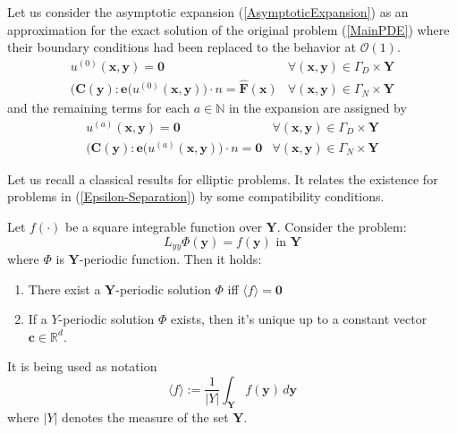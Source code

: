 Let us consider the asymptotic expansion (\ref{AsymptoticExpansion}) as an approximation for the exact solution of the original problem (\ref{MainPDE}) where their boundary conditions had been replaced to the behavior at $\mathcal{O}(1)$.
\begin{equation*}
    \begin{array}{cc}   
        u^{(0)}(\mathbf{x},\mathbf{y}) = \mathbf{0} & \forall (\mathbf{x}, \mathbf{y}) \in \Gamma_D\times \mathbf{Y}\\
        \big(\mathbf{C}(\mathbf{y}): \mathbf{e} (u^{(0)}(\mathbf{x}, \mathbf{y}) \big) \cdot n = \hat{\mathbf{F}}(\mathbf{x}) & \forall (\mathbf{x},\mathbf{y}) \in \Gamma_N \times \mathbf{Y}
    \end{array}
\end{equation*}
and the remaining terms for each $a \in \mathbb{N}$ in the expansion are assigned by
\begin{equation*}
    \begin{array}{cc}
        u^{(a)}(\mathbf{x},\mathbf{y}) = \mathbf{0} & \forall (\mathbf{x}, \mathbf{y}) \in \Gamma_D \times \mathbf{Y} \\
        \big( \mathbf{C}(\mathbf{y}): \mathbf{e} (u^{(a)}(\mathbf{x},\mathbf{y}) \big) \cdot n = \mathbf{0} & \forall  (\mathbf{x}, \mathbf{y}) \in \Gamma_N\times \mathbf{Y} 
    \end{array}
\end{equation*}

Let us recall a classical results for elliptic problems. It relates the existence for problems in (\ref{Epsilon-Separation}) by some compatibility conditions.
\begin{lem}
\label{ExistenceLemma}
Let $f(\cdot)$ be a square integrable function over $\mathbf{Y}$. Consider the problem:
\begin{equation*}
    L_{yy} \Phi(\mathbf{y}) = f(\mathbf{y}) \text{ in } \mathbf{Y}
\end{equation*}
where $\Phi$ is $\mathbf{Y}$-periodic function. Then it holds:
\begin{enumerate}
    \item There exist a $\mathbf{Y}$-periodic solution $\Phi$ iff $\langle f \rangle = \mathbf{0}$
    \item If a $Y$-periodic solution $\Phi$ exists, then it's unique up to a constant vector $\mathbf{c} \in \mathbb{R}^d$.
\end{enumerate}
\end{lem}

\begin{rem}
It is being used as notation
\begin{equation*}
    \langle f \rangle := \frac{1}{\vert Y \vert} \int_{\mathbf{Y}} f(\mathbf{y}) \, d\mathbf{y}
\end{equation*}
where $\vert Y \vert$ denotes the measure of the set $\mathbf{Y}$.
\end{rem}

